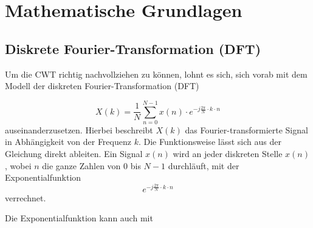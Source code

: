%
%
%
%
\section{Mathematische Grundlagen
\label{wavelets:section:teil1}}

\subsection{Diskrete Fourier-Transformation (DFT)
\label{wavelets:subsection:DFT}}
Um die CWT richtig nachvollziehen zu können, lohnt es sich, sich
vorab mit dem Modell der diskreten Fourier-Transformation (DFT)
\cite{wavelets:Hayes.1996}

\begin{equation}
	X(k)=\frac{1}{N}\sum_{n=0}^{N-1}x(n)\cdot e^{-j\frac{2\pi}{N}\cdot k\cdot n}
	\label{wavelets:equation1}
\end{equation}
auseinanderzusetzen.
Hierbei beschreibt $X(k)$  das Fourier-transformierte Signal in
Abhängigkeit von der Frequenz $k$.
Die Funktionsweise lässt sich aus der Gleichung direkt ableiten.
Ein Signal $x(n)$ wird an jeder diskreten Stelle $x(n)$, wobei $n$
die ganze Zahlen von $0$ bis $N-1$ durchläuft, mit der Exponentialfunktion
\[e^{-j\frac{2\pi}{N}\cdot k\cdot n}\] verrechnet.

Die Exponentialfunktion kann auch mit


